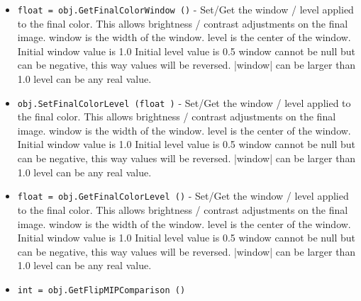 \begin{itemize}
\item  \verb|float = obj.GetFinalColorWindow ()| -  Set/Get the window / level applied to the final color.
 This allows brightness / contrast adjustments on the
 final image.
 window is the width of the window.
 level is the center of the window.
 Initial window value is 1.0
 Initial level value is 0.5
 window cannot be null but can be negative, this way
 values will be reversed.
 |window| can be larger than 1.0
 level can be any real value.

\item  \verb|obj.SetFinalColorLevel (float )| -  Set/Get the window / level applied to the final color.
 This allows brightness / contrast adjustments on the
 final image.
 window is the width of the window.
 level is the center of the window.
 Initial window value is 1.0
 Initial level value is 0.5
 window cannot be null but can be negative, this way
 values will be reversed.
 |window| can be larger than 1.0
 level can be any real value.

\item  \verb|float = obj.GetFinalColorLevel ()| -  Set/Get the window / level applied to the final color.
 This allows brightness / contrast adjustments on the
 final image.
 window is the width of the window.
 level is the center of the window.
 Initial window value is 1.0
 Initial level value is 0.5
 window cannot be null but can be negative, this way
 values will be reversed.
 |window| can be larger than 1.0
 level can be any real value.

\item  \verb|int = obj.GetFlipMIPComparison ()|

\end{itemize}
